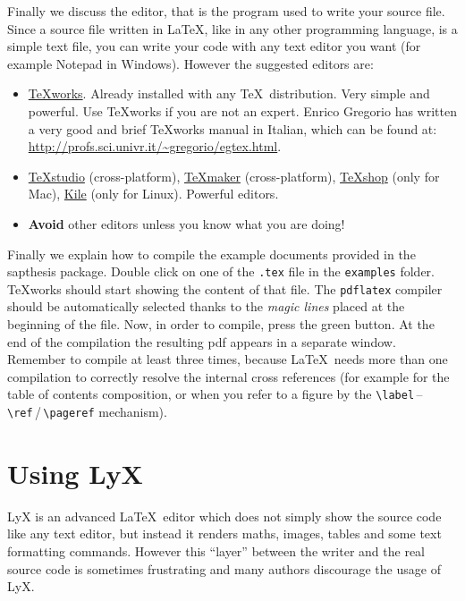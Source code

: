 \documentclass[a5paper,11pt]{article}
\newcommand{\bs}{\textbackslash}
\begin{document}
Finally we discuss the editor, that is the program used to write your source file. Since a source file written in \LaTeX, like in any other programming language, is a simple text file, you can write your code with any text editor you want (for example Notepad in Windows). However the suggested editors are:
\begin{itemize}
\item \href{http://tug.org/texworks/}{TeXworks}. Already installed with any \TeX\ distribution. Very simple and powerful. Use TeXworks if you are not an expert. Enrico Gregorio has written a very good and brief TeXworks manual in Italian, which can be found at: {\small \url{http://profs.sci.univr.it/~gregorio/egtex.html}}.

\item \href{http://texstudio.sourceforge.net/}{TeXstudio} (cross-platform), \href{http://www.xm1math.net/texmaker/}{TeXmaker} (cross-platform), \href{http://pages.uoregon.edu/koch/texshop/}{TeXshop} (only for Mac), \href{http://kile.sourceforge.net/}{Kile} (only for Linux). Powerful editors.

\item \textbf{Avoid} other editors unless you know what you are doing!

\end{itemize}

Finally we explain how to compile the example documents provided in the \textsf{sapthesis} package. Double click on one of the \texttt{.tex} file in the \texttt{examples} folder. 
TeXworks should start showing the content of that file. 
The \texttt{pdflatex} compiler should be automatically selected thanks to the \emph{magic lines} placed at the beginning of the file.
Now, in order to compile, press the green button. 
At the end of the compilation the resulting pdf appears in a separate window. Remember to compile at least three times, because \LaTeX\ needs more than one compilation to correctly resolve the internal cross references (for example for the table of contents composition, or when you refer to a figure by the \texttt{\bs label}\,--\,\texttt{\bs ref}\,/\,\texttt{\bs pageref} mechanism).



\section{Using LyX}

LyX is an advanced \LaTeX\ editor which does not simply show the source code like any text editor, but instead it renders maths, images, tables and some text formatting commands. However this ``layer'' between the writer and the real source code is sometimes frustrating and many authors discourage the usage of LyX.
\end{document}
